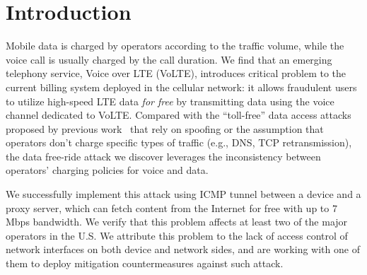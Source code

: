 

\section{Introduction}

Mobile data is charged by operators according to the traffic volume, while the voice call is usually charged by the call duration. We find that an emerging telephony service, Voice over LTE (VoLTE), introduces critical problem to the current billing system deployed in the cellular network: it allows fraudulent users to utilize high-speed LTE data \emph{for free} by transmitting data using the voice channel dedicated to VoLTE. Compared with the ``toll-free'' data access attacks proposed by previous work~\cite{peng2012mobile,go2014gaining} that rely on spoofing or the assumption that operators don't charge specific types of traffic (e.g., DNS, TCP retransmission), the data free-ride attack we discover leverages the inconsistency between operators' charging policies for voice and data.

We successfully implement this attack using ICMP tunnel between a device and a proxy server, which can fetch content from the Internet for free with up to 7 Mbps bandwidth. We verify that this problem affects at least two of the major operators in the U.S. We attribute this problem to the lack of access control of network interfaces on both device and network sides, and are working with one of them to deploy mitigation countermeasures against such attack. 